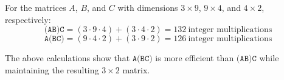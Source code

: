 \documentclass[letterpaper, 12pt]{article}
\begin{document}
For the matrices $A$, $B$, and $C$ with dimensions $3 \times 9$, $9 \times 4$, and $4 \times 2$, respectively:
\[\texttt{(AB)C} = (3 \cdot 9 \cdot 4) + (3 \cdot 4 \cdot 2) = 132 \ \text{integer multiplications}\]
\[\texttt{A(BC)} = (9 \cdot 4 \cdot 2) + (3 \cdot 9 \cdot 2) = 126 \ \text{integer multiplications}\]

The above calculations show that $\texttt{A(BC)}$ is more efficient than $\texttt{(AB)C}$ while maintaining the resulting $3 \times 2$ matrix.
\end{document}
